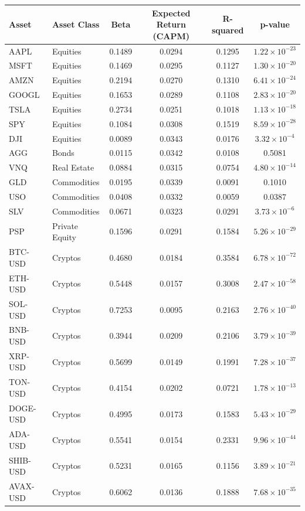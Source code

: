 \documentclass{ledger}
\begin{document}
\begin{longtable}{|l|l|c|c|c|c|}
\hline
\textbf{Asset} & \textbf{Asset Class} & \textbf{Beta} & \textbf{Expected Return (CAPM)} & \textbf{R-squared} & \textbf{p-value} \\
\hline
AAPL & Equities & 0.1489 & 0.0294 & 0.1295 & $1.22 \times 10^{-23}$ \\
MSFT & Equities & 0.1469 & 0.0295 & 0.1127 & $1.30 \times 10^{-20}$ \\
AMZN & Equities & 0.2194 & 0.0270 & 0.1310 & $6.41 \times 10^{-24}$ \\
GOOGL & Equities & 0.1653 & 0.0289 & 0.1108 & $2.83 \times 10^{-20}$ \\
TSLA & Equities & 0.2734 & 0.0251 & 0.1018 & $1.13 \times 10^{-18}$ \\
SPY & Equities & 0.1084 & 0.0308 & 0.1519 & $8.59 \times 10^{-28}$ \\
DJI & Equities & 0.0089 & 0.0343 & 0.0176 & $3.32 \times 10^{-4}$ \\
AGG & Bonds & 0.0115 & 0.0342 & 0.0108 & 0.5081 \\
VNQ & Real Estate & 0.0884 & 0.0315 & 0.0754 & $4.80 \times 10^{-14}$ \\
GLD & Commodities & 0.0195 & 0.0339 & 0.0091 & 0.1010 \\
USO & Commodities & 0.0408 & 0.0332 & 0.0059 & 0.0387 \\
SLV & Commodities & 0.0671 & 0.0323 & 0.0291 & $3.73 \times 10^{-6}$ \\
PSP & Private Equity & 0.1596 & 0.0291 & 0.1584 & $5.26 \times 10^{-29}$ \\
BTC-USD & Cryptos & 0.4680 & 0.0184 & 0.3584 & $6.78 \times 10^{-72}$ \\
ETH-USD & Cryptos & 0.5448 & 0.0157 & 0.3008 & $2.47 \times 10^{-58}$ \\
SOL-USD & Cryptos & 0.7253 & 0.0095 & 0.2163 & $2.76 \times 10^{-40}$ \\
BNB-USD & Cryptos & 0.3944 & 0.0209 & 0.2106 & $3.79 \times 10^{-39}$ \\
XRP-USD & Cryptos & 0.5699 & 0.0149 & 0.1991 & $7.28 \times 10^{-37}$ \\
TON-USD & Cryptos & 0.4154 & 0.0202 & 0.0721 & $1.78 \times 10^{-13}$ \\
DOGE-USD & Cryptos & 0.4995 & 0.0173 & 0.1583 & $5.43 \times 10^{-29}$ \\
ADA-USD & Cryptos & 0.5541 & 0.0154 & 0.2331 & $9.96 \times 10^{-44}$ \\
SHIB-USD & Cryptos & 0.5231 & 0.0165 & 0.1156 & $3.89 \times 10^{-21}$ \\
AVAX-USD & Cryptos & 0.6062 & 0.0136 & 0.1888 & $7.68 \times 10^{-35}$ \\
\hline
\end{longtable}
\end{document}
